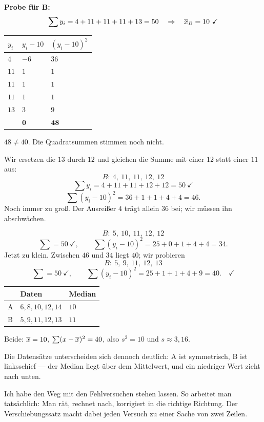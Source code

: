 \begin{aufgabe}
\textbf{Probe für B:}
\[ \sum y_i = 4+11+11+11+13 = 50 \quad\Rightarrow\quad \MW_B = 10 \ \checkmark \]
\begin{center}
{\small
\renewcommand{\arraystretch}{1.32}
\begin{tabular}{@{}P{1.2cm}P{1.6cm}P{1.8cm}@{}}
\toprule
$y_i$ & $y_i - 10$ & $(y_i-10)^2$\\
\midrule
$4$ & $-6$ & $36$\\
$11$ & $1$ & $1$\\
$11$ & $1$ & $1$\\
$11$ & $1$ & $1$\\
$13$ & $3$ & $9$\\
\midrule
& $\mathbf{0}$ & $\mathbf{48}$\\
\bottomrule
\end{tabular}}
\end{center}

$48 \neq 40$. Die Quadratsummen stimmen noch nicht.

Wir ersetzen die $13$ durch $12$ und gleichen die Summe mit einer $12$ statt einer $11$ aus:
\[ B: \ 4,\ 11,\ 11,\ 12,\ 12 \]
\[ \sum y_i = 4+11+11+12+12 = 50 \ \checkmark \]
\[ \sum (y_i-10)^2 = 36 + 1 + 1 + 4 + 4 = 46 . \]
Noch immer zu groß. Der Ausreißer $4$ trägt allein $36$ bei; wir müssen ihn abschwächen.

\[ B: \ 5,\ 10,\ 11,\ 12,\ 12 \]
\[ \sum = 50 \ \checkmark, \qquad \sum(y_i-10)^2 = 25+0+1+4+4 = 34 . \]
Jetzt zu klein. Zwischen $46$ und $34$ liegt $40$; wir probieren
\[ B: \ 5,\ 9,\ 11,\ 12,\ 13 \]
\[ \sum = 50 \ \checkmark, \qquad \sum(y_i-10)^2 = 25+1+1+4+9 = 40 . \quad \checkmark \]

\begin{center}
\renewcommand{\arraystretch}{1.45}
\begin{tabular}{@{}P{2.4cm}P{3.0cm}P{2.4cm}@{}}
\toprule
& \textbf{Daten} & \textbf{Median}\\
\midrule
A & $6, 8, 10, 12, 14$ & $10$\\
B & $5, 9, 11, 12, 13$ & $11$\\
\bottomrule
\end{tabular}
\end{center}
Beide: $\overline{x} = 10$, $\sum(x-\overline{x})^2 = 40$, also $s^2 = 10$ und $s \approx 3{,}16$.

Die Datensätze unterscheiden sich dennoch deutlich: A ist symmetrisch, B ist linksschief --- der Median liegt über dem Mittelwert, und ein niedriger Wert zieht nach unten.

Ich habe den Weg mit den Fehlversuchen stehen lassen. So arbeitet man tatsächlich: Man rät, rechnet nach, korrigiert in die richtige Richtung. Der Verschiebungssatz macht dabei jeden Versuch zu einer Sache von zwei Zeilen.
\end{aufgabe}

